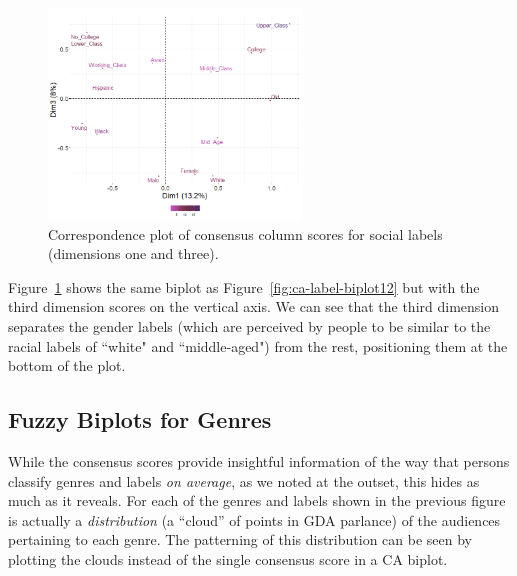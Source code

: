 \documentclass[12pt]{article}
\begin{document}
\begin{figure}[t]
    \captionsetup[subfigure]{font=footnotesize,labelfont=footnotesize}
    \centering
        \includegraphics[trim={0cm 0cm 0cm 0cm},clip, width=0.6\textwidth]{Plots/ca-label-col13.png}
    \caption{Correspondence plot of consensus column scores for social labels (dimensions one and three).}
    \label{fig:ca-label-biplot13}
\end{figure}

Figure~\ref{fig:ca-label-biplot13} shows the same biplot as Figure~\ref{fig:ca-label-biplot12} but with the third dimension scores on the vertical axis. We can see that the third dimension separates the gender labels (which are perceived by people to be similar to the racial labels of ``white" and ``middle-aged") from the rest, positioning them at the bottom of the plot. 
\subsection*{Fuzzy Biplots for Genres}
While the consensus scores provide insightful information of the way that persons classify genres and labels \textit{on average}, as we noted at the outset, this hides as much as it reveals. For each of the genres and labels shown in the previous figure is actually a \textit{distribution} (a ``cloud'' of points in GDA parlance) of the audiences pertaining to each genre. The patterning of this distribution can be seen by plotting the clouds instead of the single consensus score in a CA biplot. 
\end{document}
